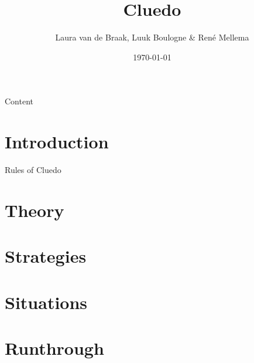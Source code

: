 \documentclass{beamer}
\title{Cluedo}
\author{Laura van de Braak, Luuk Boulogne \& Ren\'e Mellema}
\date{\today}
\begin{document}
\begin{frame}
    \titlepage
\end{frame}

\begin{frame}{Content}
  \tableofcontents
\end{frame}

\section{Introduction}

\begin{frame}{Rules of Cluedo}
  
\end{frame}

\section{Theory}


\section{Strategies}


\section{Situations}


\section{Runthrough}

\end{document}
